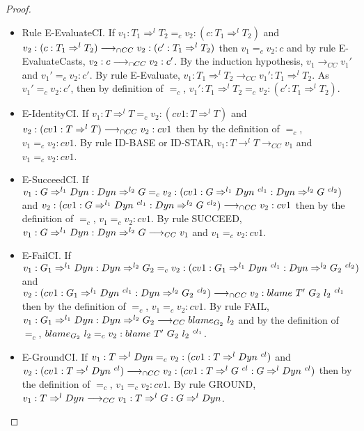 \documentclass[a4paper]{article}
\begin{document}
\begin{proof}
\begin{itemize}
\begin{itemize}
\begin{itemize}
            \item Rule E-EvaluateCI.
            If $v_1 : T_1 \Rightarrow^l T_2 =_c v_2 : (c : T_1 \Rightarrow^l T_2)$ and $v_2 : (c : T_1 \Rightarrow^l T_2) \longrightarrow_{\cap CC} v_2 : (c' : T_1 \Rightarrow^l T_2)$ then $v_1 =_c v_2 : c$ and by rule E-EvaluateCasts, $v_2 : c \longrightarrow_{\cap CC} v_2 : c'$.
            By the induction hypothesis, $v_1 \longrightarrow_{CC} v_1'$ and $v_1' =_c v_2 : c'$.
            By rule E-Evaluate, $v_1 : T_1 \Rightarrow^l T_2 \longrightarrow_{CC} v_1' : T_1 \Rightarrow^l T_2$.
            As $v_1' =_c v_2 : c'$, then by definition of $=_c$, $v_1' : T_1 \Rightarrow^l T_2 =_c v_2 : (c' : T_1 \Rightarrow^l T_2)$.
            \item E-IdentityCI.
            If $v_1 : T \Rightarrow^l T =_c v_2 : (cv1 : T \Rightarrow^l T)$ and $v_2 : (cv1 : T \Rightarrow^l T) \longrightarrow_{\cap CC} v_2 : cv1$ then by the definition of $=_c$, $v_1 =_c v_2 : cv1$.
            By rule ID-BASE or ID-STAR, $v_1 : T \rightarrow^l T \longrightarrow_{CC} v_1$ and $v_1 =_c v_2 : cv1$.
            \item E-SucceedCI.
            If $v_1 : G \Rightarrow^{l_1} \Dyn : \Dyn \Rightarrow^{l_2} G =_c v_2 : (cv1 : G \Rightarrow^{l_1} \Dyn\ ^{cl_1} : \Dyn \Rightarrow^{l_2} G\ ^{cl_2})$ and $v_2 : (cv1 : G \Rightarrow^{l_1} Dyn\ ^{cl_1} : Dyn \Rightarrow^{l_2} G\ ^{cl_2}) \longrightarrow_{\cap CC} v_2 : cv1$ then by the definition of $=_c$, $v_1 =_c v_2 : cv1$.
            By rule SUCCEED, $v_1 : G \Rightarrow^{l_1} Dyn : Dyn \Rightarrow^{l_2} G \longrightarrow_{CC} v_1$ and $v_1 =_c v_2 : cv1$.
            \item E-FailCI.
            If $v_1 : G_1 \Rightarrow^{l_1} \Dyn : \Dyn \Rightarrow^{l_2} G_2 =_c v_2 : (cv1 : G_1 \Rightarrow^{l_1} \Dyn\ ^{cl_1} : \Dyn \Rightarrow^{l_2} G_2\ ^{cl_2})$ and $v_2 : (cv1 : G_1 \Rightarrow^{l_1} Dyn\ ^{cl_1} : Dyn \Rightarrow^{l_2} G_2\ ^{cl_2}) \longrightarrow_{\cap CC} v_2 : blame\ T'\ G_2\ l_2\ ^{cl_1}$ then by the definition of $=_c$, $v_1 =_c v_2 : cv1$.
            By rule FAIL, $v_1 : G_1 \Rightarrow^{l_1} Dyn : Dyn \Rightarrow^{l_2} G_2 \longrightarrow_{CC} blame_{G_2}\ l_2$ and by the definition of $=_c$, $blame_{G_2}\ l_2 =_c v_2 : blame\ T'\ G_2\ l_2\ ^{cl_1}$.
            \item E-GroundCI.
            If $v_1 : T \Rightarrow^l Dyn =_c v_2 : (cv1 : T \Rightarrow^l Dyn\ ^{cl})$ and $v_2 : (cv1 : T \Rightarrow^l Dyn\ ^{cl}) \longrightarrow_{\cap CC} v_2 : (cv1 : T \Rightarrow^l G\ ^{cl} : G \Rightarrow^l Dyn\ ^{cl})$ then by the definition of $=_c$, $v_1 =_c v_2 : cv1$.
            By rule GROUND, $v_1 : T \Rightarrow^l Dyn \longrightarrow_{CC} v_1 : T \Rightarrow^l G : G \Rightarrow^l Dyn$.

\end{itemize}
\end{itemize}
\end{itemize}
\end{proof}
\end{document}
